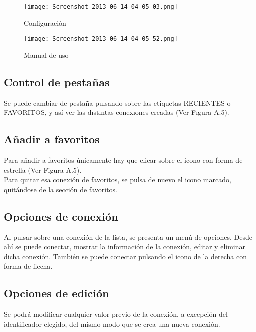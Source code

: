 \begin{figure}[h]
\hfill
\begin{minipage}[t]{.45\textwidth}
\begin{center}
\texttt{[image: Screenshot\_2013-06-14-04-05-03.png]}
\caption{Configuración}
\end{center}
\end{minipage}
\hfill
\begin{minipage}[t]{.45\textwidth}
\begin{center}
\texttt{[image: Screenshot\_2013-06-14-04-05-52.png]}
\caption{Manual de uso}
\end{center}
\end{minipage}
\hfill
\end{figure}

\subsection{Control de pestañas}
Se puede cambiar de pestaña pulsando sobre las etiquetas RECIENTES o FAVORITOS, y así ver las distintas conexiones creadas (Ver Figura A.5).
\subsection{Añadir a favoritos}
Para añadir a favoritos únicamente hay que clicar sobre el icono con forma de estrella (Ver Figura A.5).\\

Para quitar esa conexión de favoritos, se pulsa de nuevo el icono marcado, quitándose de la sección de favoritos.
\subsection{Opciones de conexión}
Al pulsar sobre una conexión de la lista, se presenta un menú de opciones. Desde ahí se puede conectar, mostrar la información de la conexión, editar y eliminar dicha conexión. También se puede conectar pulsando el icono de la derecha con forma de flecha.

\subsection{Opciones de edición}
Se podrá modificar cualquier valor previo de la conexión, a excepción del identificador elegido, del mismo modo que se crea una nueva conexión.
